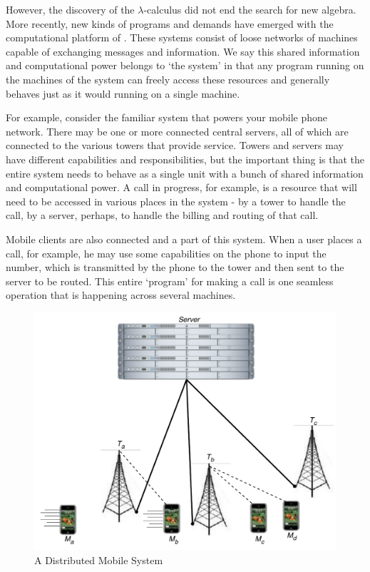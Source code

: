 However, the discovery of the $\lambda$-calculus did not end the search for new algebra.  More recently, new kinds of programs and demands have emerged with the computational platform of .  These systems consist of loose networks of machines capable of exchanging messages and information.  We say this shared information and computational power belongs to `the system' in that any program running on the machines of the system can freely access these resources and generally behaves just as it would running on a single machine.

For example, consider the familiar system that powers your mobile phone network.  There may be one or more connected central servers, all of which are connected to the various towers that provide service.  Towers and servers may have different capabilities and responsibilities, but the important thing is that the entire system needs to behave as a single unit with a bunch of shared information and computational power.  A call in progress, for example, is a resource that will need to be accessed in various places in the system - by a tower to handle the call, by a server, perhaps, to handle the billing and routing of that call.  

Mobile clients are also connected and a part of this system.  When a user places a call, for example, he may use some capabilities on the phone to input the number, which is transmitted by the phone to the tower and then sent to the server to be routed.  This entire `program' for making a call is one seamless operation that is happening across several machines.  

\begin{figure}[H]
\centering
\includegraphics[scale=0.7]{figures/cell_network.pdf} %
\caption{A Distributed Mobile System}
\label{fig_cell_network}
\end{figure}

